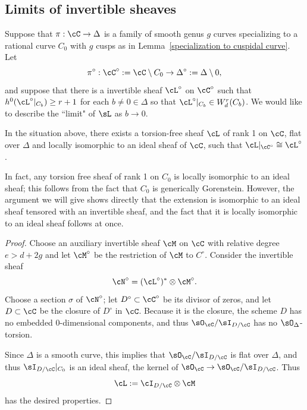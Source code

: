 \subsection{Limits of invertible sheaves}\label{invertible sheaf limits}


Suppose  that  $\pi : \cC \to \Delta$ is a family of smooth genus $g$ curves specializing to a rational curve $C_0$ with $g$ cusps as in Lemma~\ref{specialization to cuspidal curve}. 
 Let 
$$
\pi^\circ: \cC^\circ := \cC \setminus C_0\to \Delta^\circ := \Delta\setminus 0,
$$
and suppose that there is a invertible sheaf $\cL^\circ$ on $\cC^\circ$ such that $h^0(\cL^\circ|_{C_b}) \geq r+1$ for each $b \neq 0 \in \Delta$ so that $\cL^\circ|_{C_b}\in W^{r}_{d}(C_{b})$. We would like to describe the ``limit" of $\sL$ as $b \to 0$. 


\begin{lemma}\label{limit sheaf}
In the situation above, there exists a torsion-free sheaf $\cL$ of rank 1 on $\cC$, flat over $\Delta$ and locally isomorphic to
an ideal sheaf of $\cC$, such that $\cL|_{\cC^\circ} \cong \cL^\circ$.
\end{lemma}

In fact, any torsion free sheaf of rank 1 on $C_{0}$ is locally isomorphic
to an ideal sheaf; this follows from the fact that $C_{0}$ is generically Gorenstein. However, the argument we will give 
shows directly that the extension is isomorphic to an ideal sheaf tensored with an invertible sheaf, and the fact that
it is locally isomorphic to an ideal sheaf follows at once.

\begin{proof} Choose an auxiliary invertible sheaf $\cM$ on $\cC$ with relative degree $e > d + 2g$ and let $\cM^\circ$ be the restriction of $\cM$ to $C^\circ$. Consider the invertible sheaf 
$$
\cN^\circ = (\cL^\circ)^* \otimes \cM^\circ.
$$
Choose a section $\sigma$ of $\cN^\circ$; let $D^\circ \subset \cC^\circ$ be its divisor of zeros, and let $D \subset \cC$ be the closure of $D^\circ$ in $\cC$. Because it is the closure, the scheme $D$ has no embedded 
0-dimensional components, and thus $\sO_{\cC}/\sI_{D/\cC}$ has no $\sO_{\Delta}$-torsion. 

Since $\Delta$ is a smooth
curve, this implies that $\sO_{\cC}/\sI_{D/\cC}$ is flat over $\Delta$, and thus $\sI_{D/\cC}|_{C_{0}}$
is an ideal sheaf, the kernel of $\sO_{\cC} \to \sO_{\cC}/\sI_{D/\cC}$. Thus
$$
\cL := \cI_{D/\cC} \otimes \cM
$$
has the desired properties. 
\end{proof}


